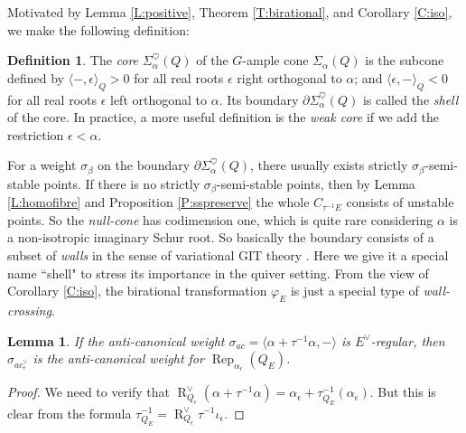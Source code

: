 \documentclass{amsart}
\newtheorem{lemma}[theorem]{Lemma}
\theoremstyle{definition}
\newtheorem{definition}[theorem]{Definition}
\theoremstyle{remark}
\numberwithin{equation}{section}
\begin{document}
Motivated by Lemma \ref{L:positive}, Theorem \ref{T:birational}, and Corollary \ref{C:iso}, we make the following definition:
\begin{definition} The {\em core} $\Sigma_\alpha^\heartsuit(Q)$ of the $G$-ample cone $\Sigma_\alpha(Q)$ is the subcone defined by ${\langle{-,\epsilon}\rangle}_Q>0$ for all real roots $\epsilon$ right orthogonal to $\alpha$; and
${\langle{\epsilon,-}\rangle}_Q<0$ for all real roots $\epsilon$ left orthogonal to $\alpha$. Its boundary $\partial\Sigma_\alpha^\heartsuit(Q)$ is called the {\em shell} of the core. In practice, a more useful definition is the {\em weak core} if we add the restriction $\epsilon<\alpha$.
\end{definition}

For a weight $\sigma_\beta$ on the boundary $\partial\Sigma_\alpha^\heartsuit(Q)$, there usually exists strictly $\sigma_\beta$-semi-stable points. If there is no strictly $\sigma_\beta$-semi-stable points, then by Lemma \ref{L:homofibre} and Proposition \ref{P:sspreserve} the whole $C_{\tau^{-1} E}$ consists of unstable points. So the {\em null-cone} has codimension one, which is quite rare considering $\alpha$ is a non-isotropic imaginary Schur root. So basically the boundary consists of a subset of {\em walls} in the sense of variational GIT theory \cite[Definition 3.3.1]{DH}. Here we give it a special name ``shell" to stress its importance in the quiver setting. From the view of Corollary \ref{C:iso}, the birational transformation $\varphi_E$ is just a special type of {\em wall-crossing}.

\begin{lemma} \label{L:acproj} If the anti-canonical weight $\sigma_{ac}={\langle{\alpha+\tau^{-1}\alpha,-}\rangle}$ is $E^\vee$-regular, then $\sigma_{ac_\epsilon^\vee}$ is the anti-canonical weight for ${\operatorname{Rep}}_{\alpha_\epsilon}(Q_E)$.
\end{lemma}
\begin{proof} We need to verify that ${\operatorname{R}}_{Q_\epsilon}^\vee(\alpha+\tau^{-1}\alpha)=\alpha_\epsilon+\tau_{Q_E}^{-1}(\alpha_\epsilon)$. But this is clear from the formula $\tau_{Q_E}^{-1}={\operatorname{R}}_{Q_\epsilon}^\vee \tau^{-1}\iota_\epsilon$.
\end{proof}
\end{document}
